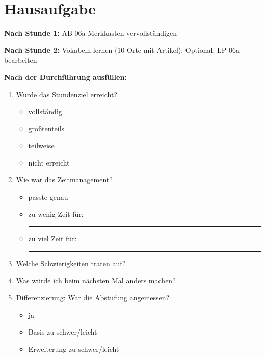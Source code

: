 \documentclass[11pt,a4paper]{article}
\begin{document}
\vspace{1em}

\section*{Hausaufgabe}

\textbf{Nach Stunde 1:} AB-06a Merkkasten vervollständigen

\textbf{Nach Stunde 2:} Vokabeln lernen (10 Orte mit Artikel); Optional: LP-06a bearbeiten

\vspace{1em}

\begin{reflexbox}

\textbf{Nach der Durchführung ausfüllen:}

\begin{enumerate}
    \item Wurde das Stundenziel erreicht?
    \begin{itemize}[nosep]
        \item[$\square$] vollständig
        \item[$\square$] größtenteils
        \item[$\square$] teilweise
        \item[$\square$] nicht erreicht
    \end{itemize}

    \item Wie war das Zeitmanagement?
    \begin{itemize}[nosep]
        \item[$\square$] passte genau
        \item[$\square$] zu wenig Zeit für: \rule{5cm}{0.4pt}
        \item[$\square$] zu viel Zeit für: \rule{5cm}{0.4pt}
    \end{itemize}

    \item Welche Schwierigkeiten traten auf?\\[2em]

    \item Was würde ich beim nächsten Mal anders machen?\\[2em]

    \item Differenzierung: War die Abstufung angemessen?
    \begin{itemize}[nosep]
        \item[$\square$] ja
        \item[$\square$] Basis zu schwer/leicht
        \item[$\square$] Erweiterung zu schwer/leicht
    \end{itemize}
\end{enumerate}

\end{reflexbox}
\end{document}
